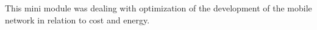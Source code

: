 This mini module was dealing with optimization of the development of the mobile network in relation to cost and energy.  